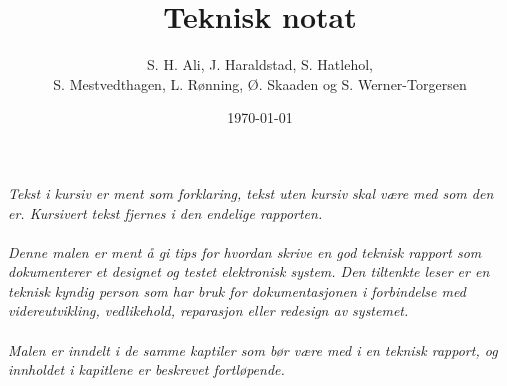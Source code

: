 \documentclass[11pt,norsk]{elsys-teknisk}
\title{Teknisk notat}
\author{S. H. Ali, J. Haraldstad, S. Hatlehol, \\ S. Mestvedthagen, L. Rønning, Ø. Skaaden og S. Werner-Torgersen}
\date{\today}
\begin{document}
\maketitle


\toc


\textit{Tekst i kursiv er ment som forklaring, tekst uten kursiv skal være med som den er. Kursivert tekst fjernes i den endelige rapporten.\\
\\
Denne malen er ment å gi tips for hvordan skrive en god teknisk rapport som dokumenterer et designet og testet elektronisk system. Den tiltenkte leser er en teknisk kyndig person som har bruk for dokumentasjonen i forbindelse med videreutvikling, vedlikehold, reparasjon eller redesign av systemet.\\
\\
Malen er inndelt i de samme kaptiler som bør være med i en teknisk rapport, og innholdet i kapitlene er beskrevet fortløpende.
\cite{bibelen}
}

\newpage



\newpage



\newpage



\newpage



\newpage



\newpage




{}

\printbibliography
%
%


\appendix

\end{document}
